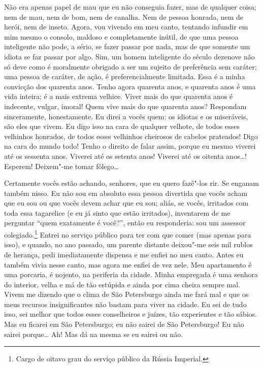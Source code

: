 Não era apenas papel de mau que eu não conseguia fazer, mas de qualquer
coisa; nem de mau, nem de bom, nem de canalha. Nem de pessoa honrada,
nem de herói, nem de inseto. Agora, vou vivendo em meu canto, tentando
infundir em mim mesmo o consolo, maldoso e completamente inútil, de que
uma pessoa inteligente não pode, a sério, se fazer passar por nada, mas
de que somente um idiota se faz passar por algo. Sim, um homem
inteligente do século dezenove não só deve como é moralmente obrigado a ser
um sujeito de preferência sem caráter; uma pessoa de caráter, de ação,
é preferencialmente limitada. Essa é a minha convicção dos quarenta
anos. Tenho agora quarenta anos, e quarenta anos é uma vida inteira; é
a mais extrema velhice. Viver mais do que quarenta anos é indecente,
vulgar, imoral! Quem vive mais do que quarenta anos? Respondam
sinceramente, honestamente. Eu direi a vocês quem: os idiotas e os
miseráveis, são eles que vivem. Eu digo isso na cara de qualquer
velhote, de todos esses velhinhos honrados, de todos esses velhinhos
cheirosos de cabelos prateados! Digo na cara do mundo todo! Tenho o
direito de falar assim, porque eu mesmo viverei até os sessenta anos.
Viverei até os setenta anos! Viverei até os oitenta anos\ldots{}! Esperem!
Deixem"-me tomar fôlego\ldots{}

Certamente vocês estão achando, senhores, que eu quero fazê"-los rir. Se
enganam também nisso. Eu não sou em absoluto essa pessoa divertida que
vocês acham que eu sou ou que vocês devem achar que eu sou; aliás, se
vocês, irritados com toda essa tagarelice (e eu já sinto que estão
irritados), inventarem de me perguntar “quem exatamente é você?”, então
eu responderia: sou um assessor colegiado.\footnote{ Cargo de oitavo
grau do serviço público da Rússia Imperial.} Entrei no serviço público
para ter com que comer (mas apenas para isso), e quando, no ano
passado, um parente distante deixou"-me seis mil rublos de herança, pedi
imediatamente dispensa e me enfiei no meu canto. Antes eu também vivia
nesse canto, mas agora me enfiei de vez nele. Meu apartamento é uma
porcaria, é nojento, na periferia da cidade. Minha empregada é uma
senhora do interior, velha e má de tão estúpida e ainda por cima cheira
sempre mal. Vivem me dizendo que o clima de São Petersburgo ainda me
fará mal e que os meus recursos insignificantes não bastam para viver
na cidade. Eu sei de tudo isso, sei melhor que todos esses conselheiros
e juízes, tão experientes e tão sábios. Mas eu ficarei em São
Petersburgo; eu não sairei de São Petersburgo! Eu não sairei porque\ldots{}
Ah! Mas dá na mesma se eu sairei ou não.

